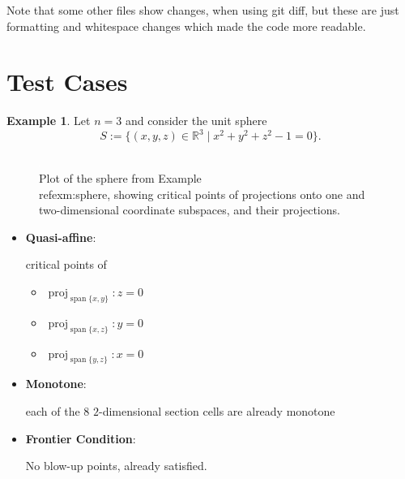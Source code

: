 \documentclass[
]{book}
\providecommand{\tightlist}{%
  \setlength{\itemsep}{0pt}\setlength{\parskip}{0pt}}
\theoremstyle{definition}
\theoremstyle{definition}
\newtheorem{example}{Example}[chapter]
\theoremstyle{definition}
\theoremstyle{definition}
\theoremstyle{remark}
\begin{document}
Note that some other files show changes, when using git diff, but these are just formatting and whitespace changes which made the code more readable.

\hypertarget{test-cases-1}{%
\section{Test Cases}\label{test-cases-1}}

\begin{example}
\protect\hypertarget{exm:sphere}{}\label{exm:sphere}Let \(n = 3\) and consider the unit sphere
\[
S := \{ (x,y,z) \in \mathbb{R}^3 \mid x^2 + y^2 + z^2 - 1 = 0 \}.
\]
\end{example}

\begin{figure}

{\centering \includegraphics[width=0.6\linewidth]{gnuplot/sphere} 

}

\caption{Plot of the sphere from Example \\ref{exm:sphere}, showing critical points of projections onto one and two-dimensional coordinate subspaces, and their projections.}\label{fig:unnamed-chunk-2}
\end{figure}

\begin{itemize}
\item
  \textbf{Quasi-affine}:

  critical points of

  \begin{itemize}
  \tightlist
  \item
    \({\operatorname{proj}_{{\operatorname{span} \{x,y\}}}}: z = 0\)
  \item
    \({\operatorname{proj}_{{\operatorname{span} \{x,z\}}}}: y = 0\)
  \item
    \({\operatorname{proj}_{{\operatorname{span} \{y,z\}}}}: x = 0\)
  \end{itemize}
\item
  \textbf{Monotone}:

  each of the 8 \(2\)-dimensional section cells are already monotone
\item
  \textbf{Frontier Condition}:

  No blow-up points, already satisfied.
\end{itemize}
\end{document}
